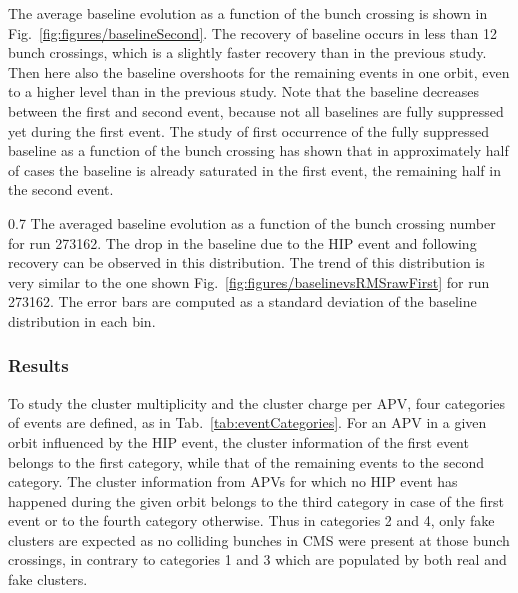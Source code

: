 The average baseline evolution as a function of the bunch crossing is shown in Fig.~\ref{fig:figures/baselineSecond}. The recovery of baseline occurs in less than 12 bunch crossings, which is a slightly faster recovery than in the previous study. Then here also the baseline overshoots for the remaining events in one orbit, even to a higher level than in the previous study. Note that the baseline decreases between the first and second event, because not all baselines are fully suppressed yet during the first event. The study of first occurrence of the fully suppressed baseline as a function of the bunch crossing has shown that in approximately half of cases the baseline is already saturated in the first event, the remaining half in the second event.

                 {0.7}       %
                 {The averaged baseline evolution as a function of the bunch crossing number for run 273162. The drop in the baseline due to the HIP event and following recovery can be observed in this distribution. The trend of this distribution is very similar to the one shown Fig.~\ref{fig:figures/baselinevsRMSrawFirst} for run 273162. The error bars are computed as a standard deviation of the baseline distribution in each bin.  } %
 

\subsubsection{Results}

To study the cluster multiplicity and the cluster charge per APV, four categories of events are defined, as in Tab.~\ref{tab:eventCategories}. For an APV in a given orbit influenced by the HIP event, the cluster information of the first event belongs to the first category, while that of the remaining events to the second category. The cluster information from APVs for which no HIP event has happened during the given orbit belongs to the third category in case of the first event or to the fourth category otherwise. Thus in categories 2 and 4, only fake clusters are expected as no colliding bunches in CMS were present at those bunch crossings, in contrary to categories 1 and 3 which are populated by both real and fake clusters.


